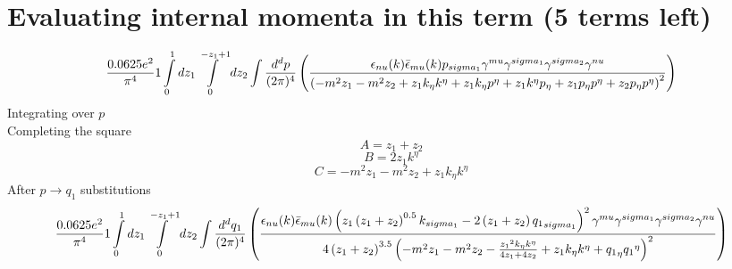 \section*{Evaluating internal momenta in this term (5 terms left)}
\begin{dmath}\frac{0.0625 e^{2}}{\pi^{4}}1\int\limits_{ 0 }^{ 1 } d{ z_{ 1 } }\int\limits_{ 0 }^{ - { z_{ 1 } } + 1 } d{ z_{ 2 } }\int\frac{d^d p }{ (2\pi)^4 }\left(\frac{\epsilon_{ \\nu }({ k }) \bar{\epsilon}_{ \\mu }({ k }) { { p }_{ \\sigma_1 } } { \gamma^{ \\mu } } { \gamma^{ \\sigma_1 } } { \gamma^{ \\sigma_2 } } { \gamma^{ \\nu } }}{\left(- m^{2} { z_{ 1 } } - m^{2} { z_{ 2 } } + { z_{ 1 } } { { k }_{ \eta } } { { k }^{ \eta } } + { z_{ 1 } } { { k }_{ \eta } } { { p }^{ \eta } } + { z_{ 1 } } { { k }^{ \eta } } { { p }_{ \eta } } + { z_{ 1 } } { { p }_{ \eta } } { { p }^{ \eta } } + { z_{ 2 } } { { p }_{ \eta } } { { p }^{ \eta } }\right)^{2}}\right)\end{dmath}
Integrating over $p$\\
Completing the square\
\begin{dmath}A = { z_{ 1 } } + { z_{ 2 } }\end{dmath}
\begin{dmath}B = 2 { z_{ 1 } } { { k }^{ \eta } }\end{dmath}
\begin{dmath}C = - m^{2} { z_{ 1 } } - m^{2} { z_{ 2 } } + { z_{ 1 } } { { k }_{ \eta } } { { k }^{ \eta } }\end{dmath}
After $p \to q_1$ substitutions
\begin{dmath}\frac{0.0625 e^{2}}{\pi^{4}}1\int\limits_{ 0 }^{ 1 } d{ z_{ 1 } }\int\limits_{ 0 }^{ - { z_{ 1 } } + 1 } d{ z_{ 2 } }\int\frac{d^d q_1 }{ (2\pi)^4 }\left(\frac{\epsilon_{ \\nu }({ k }) \bar{\epsilon}_{ \\mu }({ k }) \left({ z_{ 1 } } \left({ z_{ 1 } } + { z_{ 2 } }\right)^{0.5} { { k }_{ \\sigma_1 } } - 2 \left({ z_{ 1 } } + { z_{ 2 } }\right) { { q_1 }_{ \\sigma_1 } }\right)^{2} { \gamma^{ \\mu } } { \gamma^{ \\sigma_1 } } { \gamma^{ \\sigma_2 } } { \gamma^{ \\nu } }}{4 \left({ z_{ 1 } } + { z_{ 2 } }\right)^{3.5} \left(- m^{2} { z_{ 1 } } - m^{2} { z_{ 2 } } - \frac{{ z_{ 1 } }^{2} { { k }_{ \eta } } { { k }^{ \eta } }}{4 { z_{ 1 } } + 4 { z_{ 2 } }} + { z_{ 1 } } { { k }_{ \eta } } { { k }^{ \eta } } + { { q_1 }_{ \eta } } { { q_1 }^{ \eta } }\right)^{2}}\right)\end{dmath}
